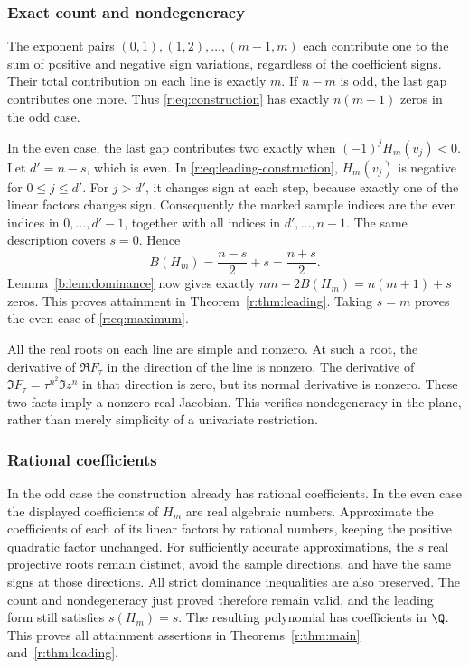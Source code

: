 \documentclass[UTF8,11pt]{ctexart}
\theoremstyle{definition}
\numberwithin{equation}{section}
\begin{document}
\subsubsection{Exact count and nondegeneracy}
The exponent pairs $(0,1),(1,2),\ldots,(m-1,m)$ each contribute one to
the sum of positive and negative sign variations, regardless of the
coefficient signs. Their total contribution on each line is exactly
$m$. If $n-m$ is odd, the last gap contributes one more. Thus
\eqref{r:eq:construction} has exactly $n(m+1)$ zeros in the odd case.

In the even case, the last gap contributes two exactly when
$(-1)^jH_m(v_j)<0$. Let $d'=n-s$, which is even. In
\eqref{r:eq:leading-construction}, $H_m(v_j)$ is negative for
$0\le j\le d'$. For $j>d'$, it changes sign at each step, because
exactly one of the linear factors changes sign. Consequently the
marked sample indices are the even indices in $0,\ldots,d'-1$,
together with all indices in $d',\ldots,n-1$. The same description
covers $s=0$. Hence
\[
 B(H_m)=\frac{n-s}{2}+s=\frac{n+s}{2}.
\]
Lemma~\ref{b:lem:dominance} now gives exactly $nm+2B(H_m)=n(m+1)+s$
zeros. This proves attainment in Theorem~\ref{r:thm:leading}. Taking
$s=m$ proves the even case of \eqref{r:eq:maximum}.

All the real roots on each line are simple and nonzero. At such a
root, the derivative of $\Re F_\tau$ in the direction of the line is
nonzero. The derivative of $\Im F_\tau=\tau^{n^2}\Im z^n$ in that
direction is zero, but its normal derivative is nonzero. These two
facts imply a nonzero real Jacobian. This verifies nondegeneracy in
the plane, rather than merely simplicity of a univariate restriction.

\subsubsection{Rational coefficients}
In the odd case the construction already has rational coefficients.
In the even case the displayed coefficients of $H_m$ are real
algebraic numbers. Approximate the coefficients of each of its linear
factors by rational numbers, keeping the positive quadratic factor
unchanged. For sufficiently accurate approximations, the $s$ real
projective roots remain distinct, avoid the sample directions, and
have the same signs at those directions. All strict dominance
inequalities are also preserved. The count and nondegeneracy just
proved therefore remain valid, and the leading form still satisfies
$s(H_m)=s$. The resulting polynomial has coefficients in $\Q$.
This proves all attainment assertions in Theorems~\ref{r:thm:main}
and~\ref{r:thm:leading}.
\end{document}
